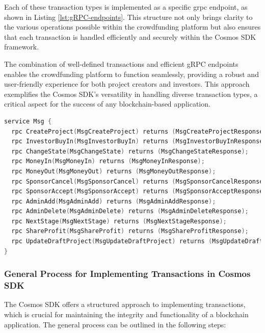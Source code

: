 Each of these transaction types is implemented as a specific \gls{grpc} endpoint, as shown in Listing \ref{lst:gRPC-endpoints}. This structure not only brings clarity to the various operations possible within the crowdfunding platform but also ensures that each transaction is handled efficiently and securely within the Cosmos SDK framework.

The combination of well-defined transactions and efficient gRPC endpoints enables the crowdfunding platform to function seamlessly, providing a robust and user-friendly experience for both project creators and investors. This approach exemplifies the Cosmos SDK's versatility in handling diverse transaction types, a critical aspect for the success of any blockchain-based application.

\begin{lstlisting}[language=go, caption=gRPC endpoints definition,label={lst:gRPC-endpoints}]
service Msg {
  rpc CreateProject(MsgCreateProject) returns (MsgCreateProjectResponse);
  rpc InvestorBuyIn(MsgInvestorBuyIn) returns (MsgInvestorBuyInResponse);
  rpc ChangeState(MsgChangeState) returns (MsgChangeStateResponse);
  rpc MoneyIn(MsgMoneyIn) returns (MsgMoneyInResponse);
  rpc MoneyOut(MsgMoneyOut) returns (MsgMoneyOutResponse);
  rpc SponsorCancel(MsgSponsorCancel) returns (MsgSponsorCancelResponse);
  rpc SponsorAccept(MsgSponsorAccept) returns (MsgSponsorAcceptResponse);
  rpc AdminAdd(MsgAdminAdd) returns (MsgAdminAddResponse);
  rpc AdminDelete(MsgAdminDelete) returns (MsgAdminDeleteResponse);
  rpc NextStage(MsgNextStage) returns (MsgNextStageResponse);
  rpc ShareProfit(MsgShareProfit) returns (MsgShareProfitResponse);
  rpc UpdateDraftProject(MsgUpdateDraftProject) returns (MsgUpdateDraftProjectResponse);
}
\end{lstlisting}

\subsubsection{General Process for Implementing Transactions in Cosmos SDK}

The Cosmos SDK offers a structured approach to implementing transactions, which is crucial for maintaining the integrity and functionality of a blockchain application. The general process can be outlined in the following steps:

